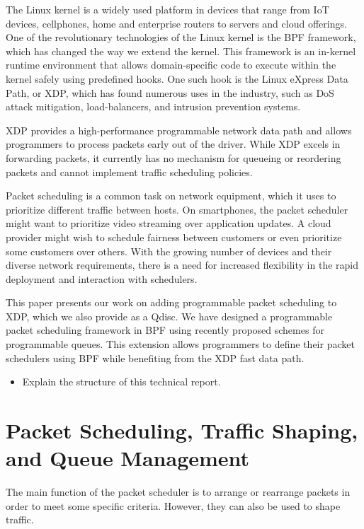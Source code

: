 \documentclass[sigconf, nonacm]{acmart}
\begin{document}
The Linux kernel is a widely used platform in devices that range from IoT
devices, cellphones, home and enterprise routers to servers and cloud offerings.
One of the revolutionary technologies of the Linux kernel is the BPF framework,
which has changed the way we extend the kernel. This framework is an in-kernel
runtime environment that allows domain-specific code to execute within the
kernel safely using predefined hooks. One such hook is the Linux eXpress Data
Path\cite{hoiland2018express}, or XDP, which has found numerous uses in the
industry, such as DoS attack mitigation, load-balancers, and intrusion
prevention systems.

XDP provides a high-performance programmable network data path and allows
programmers to process packets early out of the driver. While XDP excels in
forwarding packets, it currently has no mechanism for queueing or reordering
packets and cannot implement traffic scheduling policies.

Packet scheduling is a common task on network equipment, which it uses to
prioritize different traffic between hosts. On smartphones, the packet scheduler
might want to prioritize video streaming over application updates. A cloud
provider might wish to schedule fairness between customers or even prioritize
some customers over others. With the growing number of devices and their diverse
network requirements, there is a need for increased flexibility in the rapid
deployment and interaction with schedulers.

This paper presents our work on adding programmable packet scheduling to XDP,
which we also provide as a Qdisc. We have designed a programmable packet
scheduling framework in BPF using recently proposed schemes for programmable
queues. This extension allows programmers to define their packet schedulers
using BPF while benefiting from the XDP fast data path.


\begin{itemize}
\item Explain the structure of this technical report.
\end{itemize}

\section{Packet Scheduling, Traffic Shaping, and Queue Management}

The main function of the packet scheduler is to arrange or rearrange packets
in order to meet some specific criteria. However, they can also be used to shape
traffic.
\end{document}
